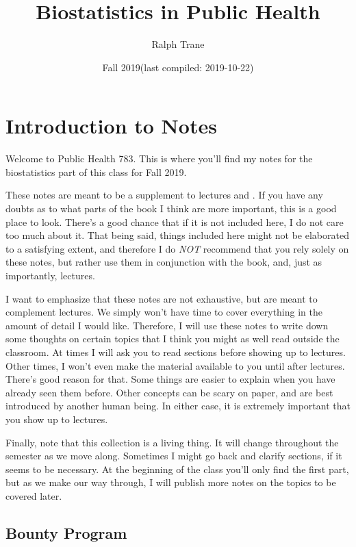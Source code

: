 \documentclass[]{book}
\title{Biostatistics in Public Health}
\author{Ralph Trane}
\date{Fall 2019(last compiled: 2019-10-22)}
\theoremstyle{definition}
\theoremstyle{definition}
\theoremstyle{definition}
\theoremstyle{remark}
\begin{document}
\maketitle

{
\setcounter{tocdepth}{1}
\tableofcontents
}
\hypertarget{introduction-to-notes}{%
\chapter{Introduction to Notes}\label{introduction-to-notes}}

\newcommand{\Var}{\text{Var}}
\newcommand{\var}{\text{var}}
\newcommand{\SD}{\text{SD}}

Welcome to Public Health 783. This is where you'll find my notes for the biostatistics part of this class for Fall 2019.

These notes are meant to be a supplement to lectures and \citet{ls}. If you have any doubts as to what parts of the book I think are more important, this is a good place to look. There's a good chance that if it is not included here, I do not care too much about it. That being said, things included here might not be elaborated to a satisfying extent, and therefore I do \emph{NOT} recommend that you rely solely on these notes, but rather use them in conjunction with the book, and, just as importantly, lectures.

I want to emphasize that these notes are not exhaustive, but are meant to complement lectures. We simply won't have time to cover everything in the amount of detail I would like. Therefore, I will use these notes to write down some thoughts on certain topics that I think you might as well read outside the classroom. At times I will ask you to read sections before showing up to lectures. Other times, I won't even make the material available to you until after lectures. There's good reason for that. Some things are easier to explain when you have already seen them before. Other concepts can be scary on paper, and are best introduced by another human being. In either case, it is extremely important that you show up to lectures.

Finally, note that this collection is a living thing. It will change throughout the semester as we move along. Sometimes I might go back and clarify sections, if it seems to be necessary. At the beginning of the class you'll only find the first part, but as we make our way through, I will publish more notes on the topics to be covered later.

\hypertarget{bounty-program}{%
\section*{Bounty Program}\label{bounty-program}}
\end{document}
